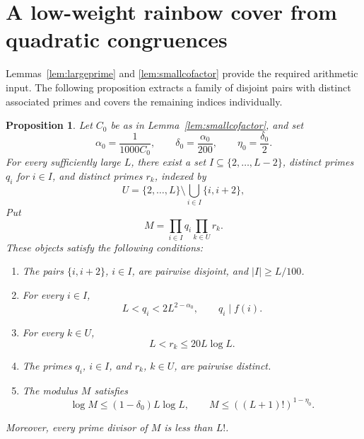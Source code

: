 \documentclass[11pt]{amsart}
\newtheorem{proposition}[theorem]{Proposition}
\theoremstyle{definition}
\theoremstyle{remark}
\begin{document}
\section{A low-weight rainbow cover from quadratic congruences}

Lemmas~\ref{lem:largeprime} and \ref{lem:smallcofactor} provide the required
arithmetic input.  The following proposition extracts a family of disjoint
pairs with distinct associated primes and covers the remaining indices
individually.

\begin{proposition}\label{prop:quadratic-cover}
Let $C_0$ be as in Lemma~\ref{lem:smallcofactor}, and set
\[
\alpha_0=\frac1{1000C_0},
\qquad
\delta_0=\frac{\alpha_0}{200},
\qquad
\eta_0=\frac{\delta_0}{2}.
\]
For every sufficiently large $L$, there exist a set
$I\subseteq\{2,\ldots,L-2\}$, distinct primes $q_i$ for $i\in I$, and
distinct primes $r_k$, indexed by
\[
U=\{2,\ldots,L\}\setminus\bigcup_{i\in I}\{i,i+2\},
\]
Put
\[
M=\prod_{i\in I}q_i\prod_{k\in U}r_k.
\]
These objects satisfy the following conditions:
\begin{enumerate}
\item The pairs $\{i,i+2\}$, $i\in I$, are pairwise disjoint, and
$|I|\geq L/100$.
\item For every $i\in I$,
\[
L<q_i<2L^{2-\alpha_0},
\qquad
q_i\mid f(i).
\]
\item For every $k\in U$,
\[
L<r_k\leq20L\log L.
\]
\item The primes $q_i$, $i\in I$, and $r_k$, $k\in U$, are pairwise
distinct.
\item The modulus $M$ satisfies
\[
\log M\leq(1-\delta_0)L\log L,
\qquad
M\leq ((L+1)!)^{1-\eta_0}.
\]
\end{enumerate}
Moreover, every prime divisor of $M$ is less than $L!$.
\end{proposition}
\end{document}
